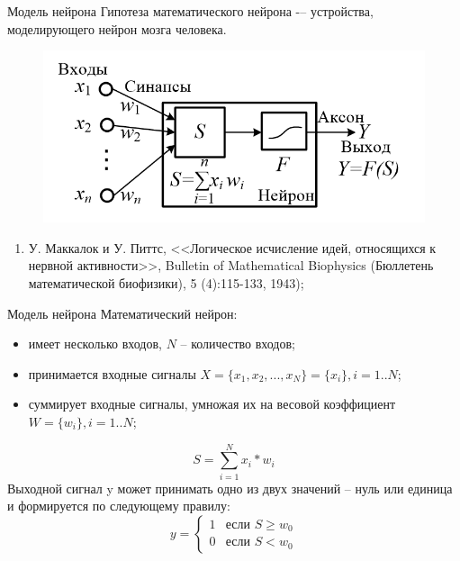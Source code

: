 \documentclass{beamer}
\begin{document}
\begin{frame}[t]{Модель нейрона}
	Гипотеза математического нейрона -– устройства, моделирующего нейрон мозга человека.
	\begin{figure}[h]
		\centering
		\includegraphics[scale=0.5]{images/lec03-neuron.png}
	\end{figure}
	\begin{enumerate}
		\item У. Маккалок и У. Питтс, <<Логическое исчисление идей, относящихся к нервной активности>>, Bulletin of Mathematical Biophysics (Бюллетень математической биофизики), 5 (4):115-133, 1943);
	\end{enumerate}
\end{frame}

\begin{frame}[t]{Модель нейрона}	
	Математический нейрон:
	\begin{itemize}
		\item имеет несколько входов, $N$ -- количество входов; 
		\item принимается входные сигналы $X=\{x_1, x_2,...,x_N\}=\{x_i\}, i=1..N$;
		\item суммирует входные сигналы, умножая их на весовой коэффициент $W=\{w_i\}, i=1..N$;
	\end{itemize}
	\[S=\sum_{i=1}^{N} x_i*w_i \]
	Выходной сигнал y может принимать одно из двух значений -- нуль или единица и формируется по следующему правилу:
	\[ y =
		\begin{cases}
		1 & \text{если } S\geq w_0 \\
		0 & \text{если } S< w_0
		\end{cases}
	\]
\end{frame}
\end{document}
